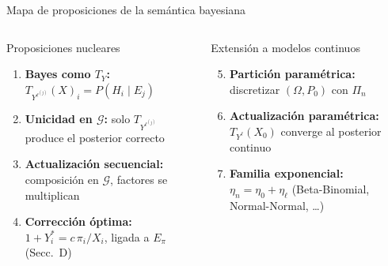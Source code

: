 \documentclass[12pt, aspectratio=169]{beamer}
\begin{document}
\begin{frame}{Mapa de proposiciones de la semántica bayesiana}

  \begin{columns}[T]
    \begin{block}{Proposiciones nucleares}
      \begin{enumerate}
        \item \textbf{Bayes como $T_Y$:}
              $T_{Y^{\ell^{(j)}}}(X)_i = P(H_i \mid E_j)$
        \item \textbf{Unicidad en $\mathcal{G}$:}
              solo $T_{Y^{\ell^{(j)}}}$ produce el posterior correcto
        \item \textbf{Actualización secuencial:}
              composición en $\mathcal{G}$, factores se multiplican
        \item \textbf{Corrección óptima:}
              $1+Y_i^* = c\,\pi_i/X_i$, ligada a $E_\pi$ (Secc.\ D)
      \end{enumerate}
    \end{block}

    \begin{block}{Extensión a modelos continuos}
      \begin{enumerate}
        \setcounter{enumi}{4}
        \item \textbf{Partición paramétrica:}
              discretizar $(\Omega, P_0)$ con $\Pi_n$
        \item \textbf{Actualización paramétrica:}
              $T_{Y^\ell}(X_0)$ converge al posterior continuo
        \item \textbf{Familia exponencial:}
              $\eta_n = \eta_0 + \eta_\ell$
              (Beta-Binomial, Normal-Normal, \dots)
      \end{enumerate}
    \end{block}
  \end{columns}
\end{frame}
\end{document}
